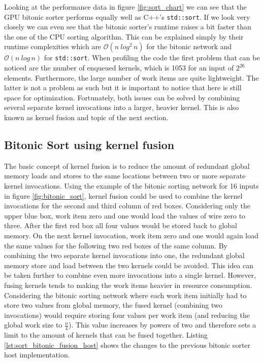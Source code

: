 Looking at the performance data in figure \ref{fig:sort_chart} we can see that the GPU bitonic sorter performs equally well as C++'s \lstinline!std::sort!. If we look very closely we can even see that the bitonic sorter's runtime raises a bit faster than the one of the CPU sorting algorithm. This can be explained simply by their runtime complexities which are $\mathcal{O}(n\: log^2\,n)$ for the bitonic network and $\mathcal{O}(n\:log\,n)$ for \lstinline!std::sort!.
When profiling the code the first problem that can be noticed are the number of enqueued kernels, which is 1053 for an input of $2^{26}$ elements. Furthermore, the large number of work items are quite lightweight. The latter is not a problem as such but it is important to notice that here is still space for optimization. Fortunately, both issues can be solved by combining several separate kernel invocations into a larger, heavier kernel. This is also known as kernel fusion and topic of the next section.


\subsection{Bitonic Sort using kernel fusion}

The basic concept of kernel fusion is to reduce the amount of redundant global memory loads and stores to the same locations between two or more separate kernel invocations.
Using the example of the bitonic sorting network for 16 inputs in figure \ref{fig:bitonic_sort}, kernel fusion could be used to combine the kernel invocations for the second and third column of red boxes. Considering only the upper blue box, work item zero and one would load the values of wire zero to three. After the first red box all four values would be stored back to global memory. On the next kernel invocation, work item zero and one would again load the same values for the following two red boxes of the same column. By combining the two separate kernel invocations into one, the redundant global memory store and load between the two kernels could be avoided.
This idea can be taken further to combine even more invocations into a single kernel. However, fusing kernels tends to making the work items heavier in resource consumption. Considering the bitonic sorting network where each work item initially had to store two values from global memory, the fused kernel (combining two invocations) would require storing four values per work item (and reducing the global work size to $\frac{n}{4}$). This value increases by powers of two and therefore sets a limit to the amount of kernels that can be fused together.
Listing \ref{lst:sort_bitonic_fusion_host} shows the changes to the previous bitonic sorter host implementation.

